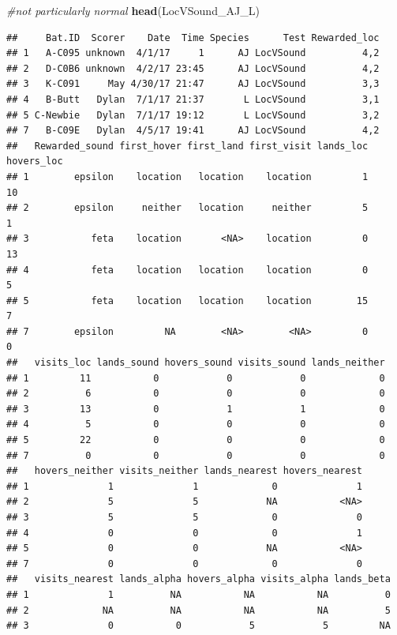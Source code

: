 \documentclass[]{article}
\newenvironment{Shaded}{\begin{snugshade}}{\end{snugshade}}
\newcommand{\KeywordTok}[1]{\textcolor[rgb]{0.13,0.29,0.53}{\textbf{{#1}}}}
\newcommand{\CommentTok}[1]{\textcolor[rgb]{0.56,0.35,0.01}{\textit{{#1}}}}
\newcommand{\NormalTok}[1]{{#1}}
\begin{document}
\begin{Shaded}
\begin{Highlighting}[]
\CommentTok{#not particularly normal}
\KeywordTok{head}\NormalTok{(LocVSound_AJ_L)}
\end{Highlighting}
\end{Shaded}

\begin{verbatim}
##     Bat.ID  Scorer    Date  Time Species      Test Rewarded_loc
## 1   A-C095 unknown  4/1/17     1      AJ LocVSound          4,2
## 2   D-C0B6 unknown  4/2/17 23:45      AJ LocVSound          4,2
## 3   K-C091     May 4/30/17 21:47      AJ LocVSound          3,3
## 4   B-Butt   Dylan  7/1/17 21:37       L LocVSound          3,1
## 5 C-Newbie   Dylan  7/1/17 19:12       L LocVSound          3,2
## 7   B-C09E   Dylan  4/5/17 19:41      AJ LocVSound          4,2
##   Rewarded_sound first_hover first_land first_visit lands_loc hovers_loc
## 1        epsilon    location   location    location         1         10
## 2        epsilon     neither   location     neither         5          1
## 3           feta    location       <NA>    location         0         13
## 4           feta    location   location    location         0          5
## 5           feta    location   location    location        15          7
## 7        epsilon         NA        <NA>        <NA>         0          0
##   visits_loc lands_sound hovers_sound visits_sound lands_neither
## 1         11           0            0            0             0
## 2          6           0            0            0             0
## 3         13           0            1            1             0
## 4          5           0            0            0             0
## 5         22           0            0            0             0
## 7          0           0            0            0             0
##   hovers_neither visits_neither lands_nearest hovers_nearest
## 1              1              1             0              1
## 2              5              5            NA           <NA>
## 3              5              5             0              0
## 4              0              0             0              1
## 5              0              0            NA           <NA>
## 7              0              0             0              0
##   visits_nearest lands_alpha hovers_alpha visits_alpha lands_beta
## 1              1          NA           NA           NA          0
## 2             NA          NA           NA           NA          5
## 3              0           0            5            5         NA

\end{verbatim}
\end{document}
